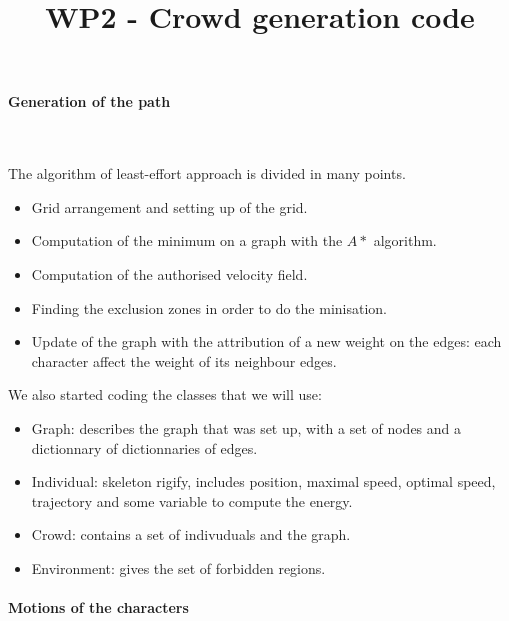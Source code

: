 \documentclass[a4paper,11pt]{article}
\theoremstyle{definition}
\theoremstyle{definition}
\theoremstyle{remark}
\theoremstyle{plain}
\theoremstyle{lemma}
\theoremstyle{corollary}
\theoremstyle{definition}
\begin{document}
  

\title{WP2 - Crowd generation code}
\author{}
\date{}


\paragraph{Generation of the path}~

\noindent The algorithm of least-effort approach is divided in many points.
\begin{itemize}
  \item Grid arrangement and setting up of the grid.
  \item Computation of the minimum on a graph with the $A*$ algorithm.
  \item Computation of the authorised velocity field.
  \item Finding the exclusion zones in order to do the minisation.
  \item Update of the graph with the attribution of a new weight on the edges: each character affect the weight of its neighbour edges.
\end{itemize}

\noindent We also started coding the classes that we will use:
\begin{itemize}
  \item Graph: describes the graph that was set up, with a set of nodes and a dictionnary of dictionnaries of edges.
  \item Individual: skeleton rigify, includes position, maximal speed, optimal speed, trajectory and some variable to compute the energy.
  \item Crowd: contains a set of indivuduals and the graph.
  \item Environment: gives the set of forbidden regions.
\end{itemize}

\paragraph{Motions of the characters}~
\end{document}
